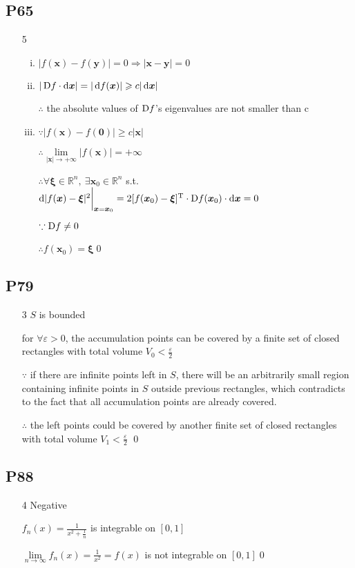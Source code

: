 \subsection{P65}
\begin{enumerate}[1]
\item[5]
    \begin{enumerate}[(i)]
    \item
    $|f(\bm{x})-f(\bm{y})|=0 \Rightarrow |\bm{x}-\bm{y}|=0 $

    \item
    $|\Dif f \cdot \dif \bm{x}|=|\dif f(\bm{x})| \geqslant c|\dif\bm{x}|$
    \par $\therefore$ the absolute values of $\Dif f$'s eigenvalues are not smaller than c 

    \item
    $\because | f(\bm{x}) - f(\bm{0})| \geqslant c|\bm{x}| $
    \par $\therefore \lim \limits_{|\bm{x}|\to +\infty} | f(\bm{x}) | = +\infty $
    \par $\therefore \forall \bm{\xi} \in \mathbb{R}^n,\ \exists \bm{x}_0 \in \mathbb{R}^n $ s.t. $ \dif |f(\bm{x})-\bm{\xi}|^2\bigg|_{\bm{x} = \bm{x}_0}  = 2 [f(\bm{x}_0)-\bm{\xi}]^\text{T} \cdot\Dif f(\bm{x}_0)\cdot\dif \bm{x} = 0 $ 
    \par $\because \Dif f \not= 0 $
    \par $\therefore f(\bm{x}_0)=\bm{\xi} $\qed

    \end{enumerate}
\end{enumerate}

\subsection{P79}
\begin{enumerate}[1]
    \item[3]
    $S$ is bounded 
    \par for $\forall \varepsilon >0 $, the accumulation points can be covered by a finite set of closed rectangles with total volume $V_0 <\frac{\varepsilon}{2}$
    \par $\because$ if there are infinite points left in $S$, there will be an arbitrarily small region containing infinite points in $S$ outside previous rectangles, which contradicts to the fact that all accumulation points are already covered.
    \par $\therefore$ the left points could be covered by another finite set of closed rectangles with total volume $V_1 <\frac{\varepsilon}{2}$ \qed
\end{enumerate}

\subsection{P88}
\begin{enumerate}[1]
    \item[4]
    Negative
    \par $f_n(x) = \frac{1}{x^2 + \frac{1}{n} } $ is integrable on $[0,1]$
    \par $ \lim \limits_{n\to \infty} f_n(x) = \frac{1}{x^2} = f(x) $ is not integrable on  $[0,1]$\qed
\end{enumerate}
